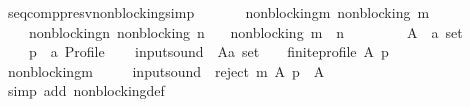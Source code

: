 \begin{isabellebody}
\endisatagproof
{\isafoldproof}%
%
\isadelimproof
\isanewline
%
\endisadelimproof
\isanewline
\isanewline
{}\isamarkupfalse%
\ seq{\isacharunderscore}{\kern0pt}comp{\isacharunderscore}{\kern0pt}presv{\isacharunderscore}{\kern0pt}non{\isacharunderscore}{\kern0pt}blocking{\isacharbrackleft}{\kern0pt}simp{\isacharbrackright}{\kern0pt}{\isacharcolon}{\kern0pt}\isanewline
\ \ \isanewline
\ \ \ \ non{\isacharunderscore}{\kern0pt}blocking{\isacharunderscore}{\kern0pt}m{\isacharcolon}{\kern0pt}\ {\isachardoublequoteopen}non{\isacharunderscore}{\kern0pt}blocking\ m{\isachardoublequoteclose}\ \isanewline
\ \ \ \ non{\isacharunderscore}{\kern0pt}blocking{\isacharunderscore}{\kern0pt}n{\isacharcolon}{\kern0pt}\ {\isachardoublequoteopen}non{\isacharunderscore}{\kern0pt}blocking\ n{\isachardoublequoteclose}\isanewline
\ \ \ {\isachardoublequoteopen}non{\isacharunderscore}{\kern0pt}blocking\ {\isacharparenleft}{\kern0pt}m\ {\isasymtriangleright}\ n{\isacharparenright}{\kern0pt}{\isachardoublequoteclose}\isanewline
%
\isadelimproof
%
\endisadelimproof
%
\isatagproof
{}\isamarkupfalse%
\ {\isacharminus}{\kern0pt}\isanewline
\ \ \isamarkupfalse%
\isanewline
\ \ \ \ A\ {\isacharcolon}{\kern0pt}{\isacharcolon}{\kern0pt}\ {\isachardoublequoteopen}{\isacharprime}{\kern0pt}a\ set{\isachardoublequoteclose}\ \isanewline
\ \ \ \ p\ {\isacharcolon}{\kern0pt}{\isacharcolon}{\kern0pt}\ {\isachardoublequoteopen}{\isacharprime}{\kern0pt}a\ Profile{\isachardoublequoteclose}\isanewline
\ \ \isamarkupfalse%
\ {\isacharquery}{\kern0pt}input{\isacharunderscore}{\kern0pt}sound\ {\isacharequal}{\kern0pt}\ {\isachardoublequoteopen}{\isacharparenleft}{\kern0pt}{\isacharparenleft}{\kern0pt}A{\isacharcolon}{\kern0pt}{\isacharcolon}{\kern0pt}{\isacharprime}{\kern0pt}a\ set{\isacharparenright}{\kern0pt}\ {\isasymnoteq}\ {\isacharbraceleft}{\kern0pt}{\isacharbraceright}{\kern0pt}\ {\isasymand}\ finite{\isacharunderscore}{\kern0pt}profile\ A\ p{\isacharparenright}{\kern0pt}{\isachardoublequoteclose}\isanewline
\ \ \isamarkupfalse%
\ non{\isacharunderscore}{\kern0pt}blocking{\isacharunderscore}{\kern0pt}m\ \isamarkupfalse%
\isanewline
\ \ \ \ {\isachardoublequoteopen}{\isacharquery}{\kern0pt}input{\isacharunderscore}{\kern0pt}sound\ {\isasymlongrightarrow}\ reject\ m\ A\ p\ {\isasymnoteq}\ A{\isachardoublequoteclose}\isanewline
\ \ \ \ \isamarkupfalse%
\ {\isacharparenleft}{\kern0pt}simp\ add{\isacharcolon}{\kern0pt}\ non{\isacharunderscore}{\kern0pt}blocking{\isacharunderscore}{\kern0pt}def{\isacharparenright}{\kern0pt}\isanewline

\end{isabellebody}
